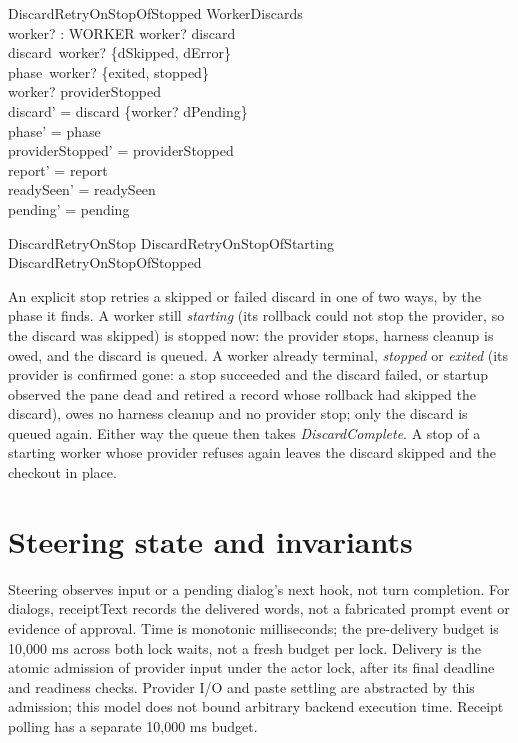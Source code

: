 \documentclass[a4paper,10pt,fleqn]{article}
\begin{document}
\begin{schema}{DiscardRetryOnStopOfStopped}
  \Delta WorkerDiscards \\
  worker? : WORKER
\where
  worker? \in \dom discard \\
  discard~worker? \in \{dSkipped, dError\} \\
  phase~worker? \in \{exited, stopped\} \\
  worker? \in providerStopped \\
  discard' = discard \oplus \{worker? \mapsto dPending\} \\
  phase' = phase \\
  providerStopped' = providerStopped \\
  report' = report \\
  readySeen' = readySeen \\
  pending' = pending
\end{schema}

\begin{zed}
  DiscardRetryOnStop 
    DiscardRetryOnStopOfStarting \lor DiscardRetryOnStopOfStopped
\end{zed}

An explicit stop retries a skipped or failed discard in one of two ways,
by the phase it finds. A worker still \textit{starting} (its rollback
could not stop the provider, so the discard was skipped) is stopped now:
the provider stops, harness cleanup is owed, and the discard is queued. A
worker already terminal, \textit{stopped} or \textit{exited} (its provider
is confirmed gone: a stop succeeded and the discard failed, or startup
observed the pane dead and retired a record whose rollback had skipped the
discard), owes no harness cleanup and no provider stop; only the discard is
queued again.
Either way the queue then takes \textit{DiscardComplete}. A stop of a
starting worker whose provider refuses again leaves the discard skipped
and the checkout in place.

\section{Steering state and invariants}

Steering observes input or a pending dialog's next hook, not turn completion.
For dialogs, receiptText records the delivered words, not a fabricated prompt
event or evidence of approval. Time is monotonic milliseconds;
the pre-delivery budget is 10,000 ms across both lock waits, not a fresh budget
per lock. Delivery is the atomic admission of provider input under the actor
lock, after its final deadline and readiness checks. Provider I/O and paste
settling are abstracted by this admission; this model does not bound arbitrary
backend execution time. Receipt polling has a separate 10,000 ms budget.
\end{document}
